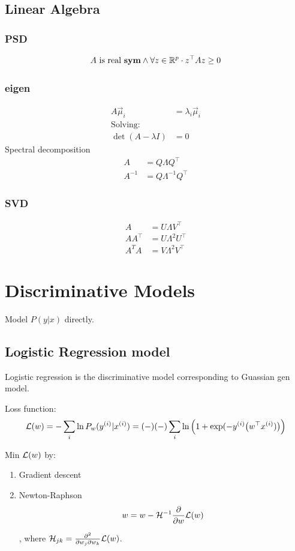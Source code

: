 \documentclass[a4paper]{report}
\begin{document}
\section{Linear Algebra}
\subsection{PSD}
$$
A \text{ is real \textbf{sym}} \wedge\forall z\in \mathbb{R}^p\cdot z^\top Az \geq 0
$$
\subsection{eigen}
\begin{align*}
A \vec\mu_i &=\lambda_i \vec\mu_i\\
\text{Solving:} \\
\det(A-\lambda I) &= 0
\end{align*}
Spectral decomposition 
\begin{align*}
A &= Q\Lambda Q^\top \\
A^{-1} &=Q\Lambda^{-1}Q^\top
\end{align*}

\subsection{SVD}
\begin{align*}
A &= U\Lambda V^\top\\
AA^\top &= U\Lambda^2U^\top \\
A^TA &= V\Lambda^2V^\top
\end{align*}

\chapter{Discriminative Models}
Model $P(y|x)$ directly.
\section{Logistic Regression model}
Logistic regression is the discriminative model corresponding to Guassian gen model.

Loss function:
$$
\mathcal{L}(w) = -\sum_{i} \ln {P_w(y^{(i)}|x^{(i)})} = (-)(-) \sum_{i} \ln {\Big(1+\exp(-y^{(i)}\big(w^\top x^{(i)})\big)\Big)}
$$

Min $\mathcal{L}(w)$ by:
\begin{enumerate}
\item Gradient descent
\item Newton-Raphson
$$
w = w -\mathcal{H}^{-1} \frac{\partial}{\partial w} \mathcal{L}(w)
$$

, where $\mathcal{H}_{jk} = \frac{\partial^2}{\partial w_j \partial w_k} \mathcal{L}(w)$.
\end{enumerate}
\end{document}
